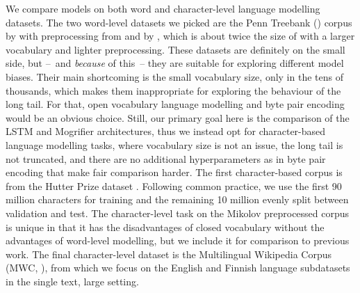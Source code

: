 We compare models on both word and character-level language modelling
datasets.
%
The two word-level datasets we picked are the Penn Treebank (\ptb)
corpus by \citet{marcus1993building} with preprocessing from
\citet{mikolov2010recurrent} and \wikitexttwo by
\citet{DBLP:journals/corr/MerityXBS16}, which is about twice the size
of \ptb with a larger vocabulary and lighter preprocessing.
%
These datasets are definitely on the small side, but --~and
\emph{because} of this~-- they are suitable for exploring different
model biases.
%
Their main shortcoming is the small vocabulary size, only in the tens
of thousands, which makes them inappropriate for exploring the
behaviour of the long tail.
%
For that, open vocabulary language modelling and byte pair encoding
\citep{sennrich2015neural} would be an obvious choice.
%
Still, our primary goal here is the comparison of the LSTM and
Mogrifier architectures, thus we instead opt for character-based
language modelling tasks, where vocabulary size is not an issue, the
long tail is not truncated, and there are no additional
hyperparameters as in byte pair encoding that make fair comparison
harder.
%
The first character-based corpus is \enwik from the Hutter Prize
dataset \citep{hutter2012human}.
%
Following common practice, we use the first 90 million characters for
training and the remaining 10 million evenly split between validation
and test.
%
The character-level task on the Mikolov preprocessed \ptb corpus
\citep{merity2018analysis} is unique in that it has the disadvantages
of closed vocabulary without the advantages of word-level modelling,
but we include it for comparison to previous work.
%
The final character-level dataset is the Multilingual Wikipedia Corpus
(MWC, \cite{kawakami2017learning}), from which we focus on the English
and Finnish language subdatasets in the single text, large setting.

